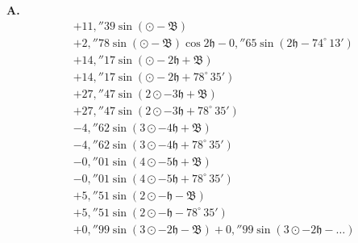 \documentclass[12pt,a4paper]{article}
\newcommand{\Ceres}{\odot}
\newcommand{\Jupiter}{\mathfrak{h}}
\begin{document}
\medskip\noindent\textbf{A.}
\begin{align*}
&+11{,}''39 \sin(\Ceres - \mathfrak{B})\\
&+2{,}''78 \sin(\Ceres - \mathfrak{B}) \cos 2\Jupiter - 0{,}''65 \sin(2\Jupiter - 74^\circ\,13')\\
&+14{,}''17 \sin(\Ceres - 2\Jupiter + \mathfrak{B})\\
&+14{,}''17 \sin(\Ceres - 2\Jupiter + 78^\circ\,35')\\
&+27{,}''47 \sin(2\Ceres - 3\Jupiter + \mathfrak{B})\\
&+27{,}''47 \sin(2\Ceres - 3\Jupiter + 78^\circ\,35')\\
&-4{,}''62 \sin(3\Ceres - 4\Jupiter + \mathfrak{B})\\
&-4{,}''62 \sin(3\Ceres - 4\Jupiter + 78^\circ\,35')\\
&-0{,}''01 \sin(4\Ceres - 5\Jupiter + \mathfrak{B})\\
&-0{,}''01 \sin(4\Ceres - 5\Jupiter + 78^\circ\,35')\\
&+5{,}''51 \sin(2\Ceres - \Jupiter - \mathfrak{B})\\
&+5{,}''51 \sin(2\Ceres - \Jupiter - 78^\circ\,35')\\
&+0{,}''99 \sin(3\Ceres - 2\Jupiter - \mathfrak{B}) + 0{,}''99 \sin(3\Ceres - 2\Jupiter - \ldots)
\end{align*}
\end{document}
